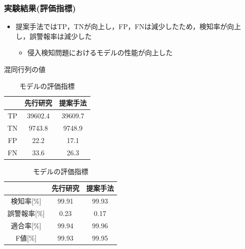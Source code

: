 \documentclass[11pt,dvipdfmx,cjk]{beamer}
\begin{document}
\begin{frame}
  \frametitle{実験結果(評価指標)}
  \begin{itemize}
    \item 提案手法ではTP，TNが向上し，FP，FNは減少したため，検知率が向上し，誤警報率は減少した
      \begin{itemize}
        \item 侵入検知問題におけるモデルの性能が向上した
      \end{itemize}
  \end{itemize}



  \begin{table}[h]
    \centering
    \begin{minipage}{0.48\textwidth}  %
      \scriptsize
        \centering
        \caption{混同行列の値}  %
        \begin{tabular}{|c|c|c|}  %
            \hline  %
            ~ &先行研究 & 提案手法\\  %
            \hline  %
            TP & 39602.4 & 39609.7\\  %
            \hline  %
            TN & 9743.8 & 9748.9\\  %
            \hline  %
            FP & 22.2 & 17.1\\  %
            \hline  %
            FN & 33.6 & 26.3\\  %
            \hline  %
        \end{tabular}
        \label{result2}  %
    \end{minipage} \hspace{0.2cm}  %
    \begin{minipage}{0.48\textwidth}  %
      \scriptsize
        \centering
        \caption{モデルの評価指標}  %
        \begin{tabular}{|c|c|c|}  %
            \hline  %
            ~ &先行研究 & 提案手法\\  %
            \hline  %
            検知率[\%] & 99.91 & 99.93\\  %
            \hline  %
            誤警報率[\%] & 0.23 & 0.17\\  %
            \hline  %
            適合率[\%] & 99.94 & 99.96\\  %
            \hline  %
            F値[\%] & 99.93 & 99.95\\  %
            \hline  %
        \end{tabular}
        \label{result3}  %
    \end{minipage}
  \end{table}
\end{frame}
\end{document}
